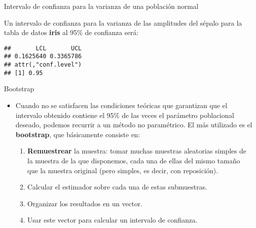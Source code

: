 \documentclass[ignorenonframetext,]{beamer}
\newenvironment{Shaded}{\begin{snugshade}}{\end{snugshade}}
\newcommand{\DataTypeTok}[1]{\textcolor[rgb]{0.13,0.29,0.53}{#1}}
\newcommand{\FloatTok}[1]{\textcolor[rgb]{0.00,0.00,0.81}{#1}}
\newcommand{\KeywordTok}[1]{\textcolor[rgb]{0.13,0.29,0.53}{\textbf{#1}}}
\newcommand{\NormalTok}[1]{#1}
\newcommand{\OperatorTok}[1]{\textcolor[rgb]{0.81,0.36,0.00}{\textbf{#1}}}
\begin{document}
\begin{frame}[fragile]{Intervalo de confianza para la varianza de una
población normal}
\protect\hypertarget{intervalo-de-confianza-para-la-varianza-de-una-poblacion-normal-3}{}

Un intervalo de confianza para la varianza de las amplitudes del sépalo
para la tabla de datos \textbf{iris} al 95\% de confianza será:

\begin{Shaded}
\end{Shaded}

\begin{verbatim}
##       LCL       UCL 
## 0.1625640 0.3365786 
## attr(,"conf.level")
## [1] 0.95
\end{verbatim}

\end{frame}

\begin{frame}{Bootstrap}
\protect\hypertarget{bootstrap}{}

\begin{itemize}
\item
  Cuando no se satisfacen las condiciones teóricas que garantizan que el
  intervalo obtenido contiene el 95\% de las veces el parámetro
  poblacional deseado, podemos recurrir a un método no paramétrico. El
  más utilizado es el \textbf{bootstrap}, que básicamente consiste en:

  \begin{enumerate}
  \item
    \textbf{Remuestrear} la muestra: tomar muchas muestras aleatorias
    simples de la muestra de la que disponemos, cada una de ellas del
    mismo tamaño que la muestra original (pero simples, es decir, con
    reposición).
  \item
    Calcular el estimador sobre cada una de estas submuestras.
  \item
    Organizar los resultados en un vector.
  \item
    Usar este vector para calcular un intervalo de confianza.
  \end{enumerate}
\end{itemize}

\end{frame}
\end{document}
